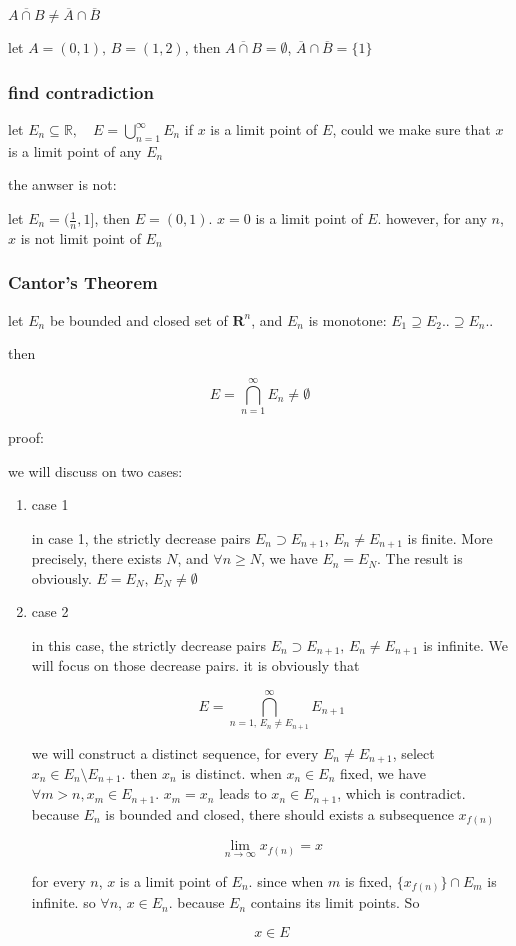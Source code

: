 \documentclass[12pt,a4paper]{ctexart}
\begin{document}
$\overline{A \cap B} \ne \overline{A} \cap \overline{B}$

let $A = (0,1),\, B=(1,2)$, then $\overline{A \cap B} = \emptyset$, $\overline{A} \cap \overline{B} = \{ 1 \}$

\subsubsection{find contradiction}

let $E_n \subseteq \mathbb{R},\quad E = \bigcup_{n=1}^{\infty}E_n$ if $x$ is a limit point of $E$, could we
make sure that $x$ is a limit point of any $E_n$

the anwser is not: 

let $E_n = (\frac{1}{n}, 1]$, then $E = (0,1)$. $x = 0$ is a limit point of $E$. however, for any $n$, $x$ is not limit point of $E_n$

\subsubsection{Cantor's Theorem}

let $E_n$ be bounded and closed set of $\mathbf{R}^n$, and $E_n$ is monotone: $E_1 \supseteq E_2 .. \supseteq E_n ..$

then 

\[
E = \bigcap _{n=1}^{\infty} E_n \ne \emptyset
\]

proof:

we will discuss on two cases:

\begin{enumerate}
    \item case 1

    in case 1, the strictly decrease pairs $E_n \supset E_{n+1},\, E_n \ne E_{n+1}$ is finite. More precisely, there exists $N$,
    and $\forall n \ge N$, we have $E_{n} = E_N$. The result is obviously. $E = E_N,\, E_N \ne \emptyset$

    \item case 2

    in this case, the strictly decrease pairs $E_n \supset E_{n+1},\, E_n \ne E_{n+1}$ is infinite. We will focus on those 
    decrease pairs. it is obviously that

    \[
        E = \bigcap_{n=1,\, E_n \ne E_{n+1}}^{\infty}E_{n+1}
    \]

    we will construct a distinct sequence, for every $E_n \ne E_{n+1}$, select $x_n \in E_n \setminus E_{n+1}$.
    then $x_n$ is distinct. when $x_n \in E_n$ fixed, we have $\forall m > n, x_m \in E_{n+1}$. $x_m = x_n$ leads to 
    $x_n \in E_{n+1}$, which is contradict. because $E_n$ is bounded and closed, there should exists a subsequence $x_{f(n)}$

    \[
        \lim_{n \to \infty}x_{f(n)} = x 
    \]

    for every $n$, $x$ is a limit point of  $E_n$. since when $m$ is fixed, $ \{ x_{f(n)} \} \cap E_m$ is infinite. so $\forall n,\, x \in E_n$.
    because $E_n$ contains its limit points. So

    \[
        x \in E
    \]

\end{enumerate}
\end{document}
